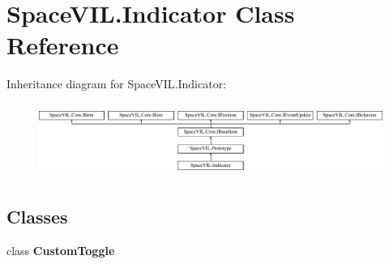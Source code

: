 \hypertarget{class_space_v_i_l_1_1_indicator}{}\section{Space\+V\+I\+L.\+Indicator Class Reference}
\label{class_space_v_i_l_1_1_indicator}
Inheritance diagram for Space\+V\+I\+L.\+Indicator\+:\begin{figure}[H]
\begin{center}
\leavevmode
\includegraphics[height=2.421622cm]{class_space_v_i_l_1_1_indicator}
\end{center}
\end{figure}
\subsection*{Classes}
\begin{DoxyCompactItemize}
\item 
class {\bfseries Custom\+Toggle}
\end{DoxyCompactItemize}
